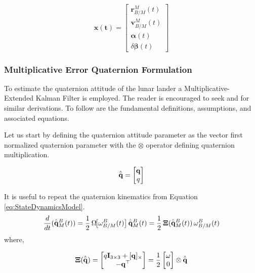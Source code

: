 \documentclass[conf]{new-aiaa}
\newcommand{\vect}[1]{\mathbf{#1}}
\newcommand{\rBM}{\vect{r}^M_{B/M}}      %
\newcommand{\vBM}{\vect{v}^M_{B/M}}      %
\newcommand{\qBM}{\hat{\Bar{\mathbf{q}}}^B_{M}}    %
\newcommand{\qUnitGeneric}{\hat{\Bar{\mathbf{q}}}}
\newcommand{\wBM}{\vect{\omega}^B_{B/M}}
\begin{document}
\begin{equation}
\vect{x(t)} =
\begin{bmatrix}
\rBM(t) \\[4pt]
\vBM(t) \\[4pt]
\vect{\alpha}(t) \\
\delta\vect{\beta}(t)
\end{bmatrix}
\label{eq:EKF_StateDef}
\end{equation}



\subsubsection{Multiplicative Error Quaternion Formulation}
To estimate the quaternion attitude of the lunar lander a Multiplicative-Extended Kalman Filter is employed. The reader is encouraged to seek \cite{crassidis2011optimal} and  \cite{markley2004multiplicative} for similar derivations. To follow are the fundamental definitions, assumptions, and associated equations.


Let us start by defining the quaternion attitude parameter as the vector first normalized quaternion parameter with the $\otimes$ operator defining quaternion multiplication.

\begin{equation}
    \qUnitGeneric =
    \begin{bmatrix}
        \vect{q} \\
        q
    \end{bmatrix}
    \label{eqDef:QuatVecFirstDef}
\end{equation}

It is useful to repeat the quaternion kinematics from Equation \ref{eq:StateDynamicsModel}.
\begin{equation}
\frac{d}{dt}(\qBM(t)) = 
\frac{1}{2}\,\Omega\!\big[\wBM(t)\big]\,\qBM(t)
=
\frac{1}{2} \, \boldsymbol{\Xi}(\qBM(t)) \, \wBM(t)
\label{eq:quat_kinematics}
\end{equation}
where,

\begin{equation}
\boldsymbol{\Xi}(\qUnitGeneric) =
\begin{bmatrix}
q \mathbf{I}_{3 \times 3} + [\vect{q}]_\times \\
- \vect{q}^\top 
\end{bmatrix}
=
\frac{1}{2}
\begin{bmatrix}
\vect{\omega} \\ 0
\end{bmatrix}
\otimes
\qUnitGeneric
\label{eq:xi_matrix}
\end{equation}
\end{document}
